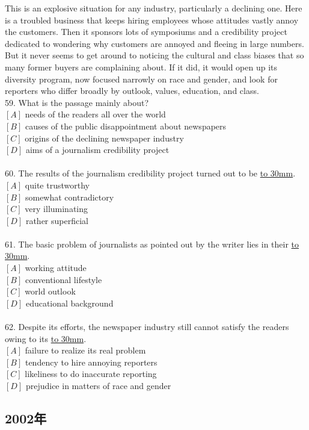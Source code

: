 \documentclass[a4paper]{article}
\begin{document}
\par
This is an explosive situation for any industry, particularly a declining one. Here is a troubled business that keeps hiring employees whose attitudes vastly annoy the customers. Then it sponsors lots of symposiums and a credibility project dedicated to wondering why customers are annoyed and fleeing in large numbers. But it never seems to get around to noticing the cultural and class biases that so many former buyers are complaining about. If it did, it would open up its diversity program, now focused narrowly on race and gender, and look for reporters who differ broadly by outlook, values, education, and class.
\\59.	What is the passage mainly about?\\$[A]$ needs of the readers all over the world\\$[B]$ causes of the public disappointment about newspapers\\$[C]$ origins of the declining newspaper industry\\$[D]$ aims of a journalism credibility project\\\\60.	The results of the journalism credibility project turned out to be \underline{\hbox to 30mm{}}.\\$[A]$ quite trustworthy\\$[B]$ somewhat contradictory\\$[C]$ very illuminating\\$[D]$ rather superficial\\\\61.	The basic problem of journalists as pointed out by the writer lies in their \underline{\hbox to 30mm{}}.\\$[A]$ working attitude\\$[B]$ conventional lifestyle\\$[C]$ world outlook\\$[D]$ educational background\\\\62.	Despite its efforts, the newspaper industry still cannot satisfy the readers owing to its \underline{\hbox to 30mm{}}.\\$[A]$ failure to realize its real problem\\$[B]$ tendency to hire annoying reporters\\$[C]$ likeliness to do inaccurate reporting\\$[D]$ prejudice in matters of race and gender\\\subsection{2002年}
\end{document}
